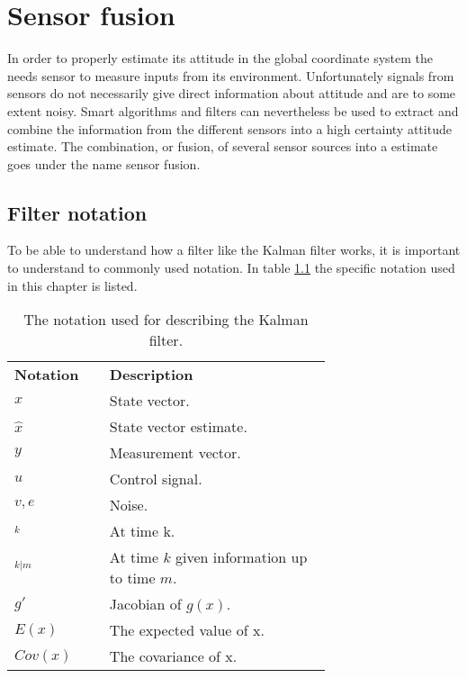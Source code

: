 \chapter{Sensor fusion}
In order to properly estimate its attitude in the global coordinate system the \abbrROV needs sensor to measure inputs from its environment.
Unfortunately signals from sensors do not necessarily give direct information about attitude and are to some extent noisy. Smart algorithms and filters can nevertheless be used to extract and combine the information from the different sensors into a high certainty attitude estimate. The combination, or fusion, of several sensor sources into a estimate goes under the name sensor fusion.
\section{Filter notation}
To be able to understand how a filter like the Kalman filter works, it is important to understand to commonly used notation.
In table \ref{tab:notationKalman} the specific notation used in this chapter is listed.
 \begin{table}[tbp]
  \centering
  \caption{\label{tab:notationKalman}%
    The notation used for describing the Kalman filter.}
    \begin{tabular}{l p{0.7\linewidth}}
    \toprule%
    \textbf{Notation} & \textbf{Description} \\
    \otoprule%
    $x$ & State vector.\\
    $\hat{x}$ & State vector estimate.\\
    $y$    & Measurement vector.\\
    $u$ & Control signal.\\
    $v,e$ & Noise.\\
    $_k$ & At time k.\\
    $_{k|m}$ & At time $k$ given information up to time $m$.\\
    $g'$ & Jacobian of $g(x)$.\\
    $E(x)$ & The expected value of x.\\
    $Cov(x)$ & The covariance of x.\\
    \bottomrule%
 \end{tabular}
\end{table}

